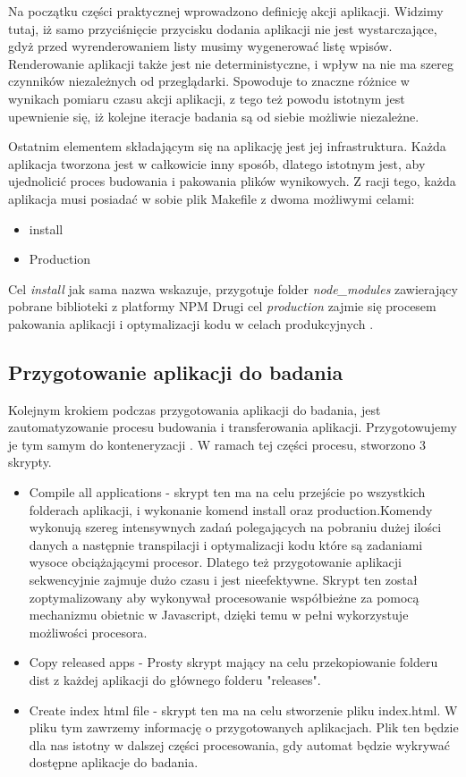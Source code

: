 Na początku części praktycznej wprowadzono definicję akcji aplikacji. Widzimy tutaj, iż samo przyciśnięcie przycisku dodania aplikacji nie jest wystarczające, gdyż przed wyrenderowaniem listy musimy wygenerować listę wpisów.
Renderowanie aplikacji także jest nie deterministyczne, i wpływ na nie ma szereg czynników niezależnych od przeglądarki.
Spowoduje to znaczne różnice w wynikach pomiaru czasu akcji aplikacji, z tego też powodu istotnym jest upewnienie się, iż kolejne iteracje badania są od siebie możliwie niezależne.

Ostatnim elementem składającym się na aplikację jest jej infrastruktura. Każda aplikacja tworzona jest w całkowicie inny sposób, dlatego istotnym jest, aby ujednolicić proces budowania i pakowania plików wynikowych.
Z racji tego, każda aplikacja musi posiadać w sobie plik Makefile \cite{gnu-makefile} z dwoma możliwymi celami:

\begin{itemize}
    \item install
    \item Production
\end{itemize}

Cel \emph{install} jak sama nazwa wskazuje, przygotuje folder \emph{node\_modules} zawierający pobrane biblioteki z platformy NPM \cite{npm}
Drugi cel \emph{production} zajmie się procesem pakowania aplikacji i optymalizacji kodu w celach produkcyjnych \cite{react-perf}.

\subsection{Przygotowanie aplikacji do badania}

Kolejnym krokiem podczas przygotowania aplikacji do badania, jest zautomatyzowanie procesu budowania i transferowania aplikacji. Przygotowujemy je tym samym do konteneryzacji \cite{kontenery}. W ramach tej części procesu, stworzono 3 skrypty.
\begin{itemize}
    \item Compile all applications - skrypt ten ma na celu przejście po wszystkich folderach aplikacji, i wykonanie komend install oraz production.Komendy wykonują szereg intensywnych zadań polegających na pobraniu dużej ilości danych a następnie transpilacji \cite{Transpilator} i optymalizacji kodu które są zadaniami wysoce obciążającymi procesor. Dlatego też przygotowanie aplikacji sekwencyjnie zajmuje dużo czasu i jest nieefektywne.
    Skrypt ten został zoptymalizowany aby wykonywał procesowanie współbieżne za pomocą mechanizmu obietnic \cite{promise}  w Javascript, dzięki temu w pełni wykorzystuje możliwości procesora.
    \item Copy released apps - Prosty skrypt mający na celu przekopiowanie folderu dist z każdej aplikacji do głównego folderu "releases".
    \item Create index html file - skrypt ten ma na celu stworzenie pliku index.html. W pliku tym zawrzemy informację o przygotowanych aplikacjach. Plik ten będzie dla nas istotny w dalszej części procesowania, gdy automat będzie wykrywać dostępne  aplikacje do badania.
\end{itemize}

